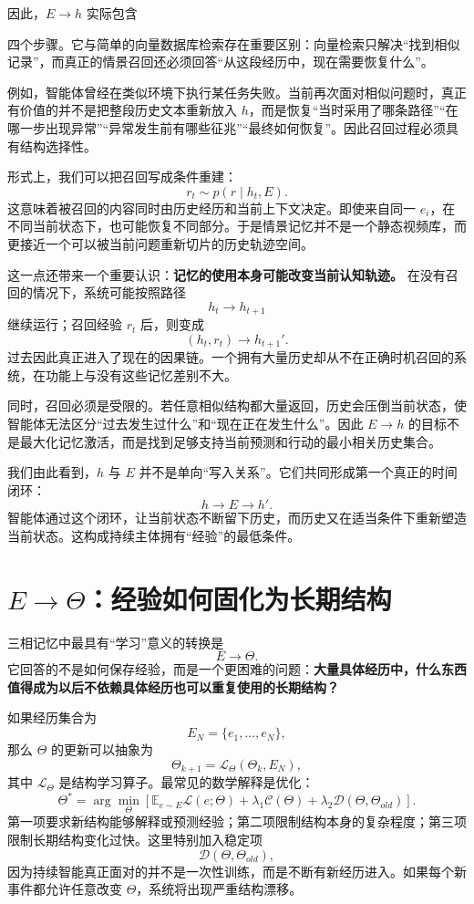 因此，$E\rightarrow h$ 实际包含
\begin{statementbox}
\centering
{}
\end{statementbox}
四个步骤。它与简单的向量数据库检索存在重要区别：向量检索只解决“找到相似记录”，而真正的情景召回还必须回答“从这段经历中，现在需要恢复什么”。

例如，智能体曾经在类似环境下执行某任务失败。当前再次面对相似问题时，真正有价值的并不是把整段历史文本重新放入 $h$，而是恢复“当时采用了哪条路径”“在哪一步出现异常”“异常发生前有哪些征兆”“最终如何恢复”。因此召回过程必须具有结构选择性。

形式上，我们可以把召回写成条件重建：
\[
r_t
\sim
p
\left(
r\mid h_t,E
\right).
\]
这意味着被召回的内容同时由历史经历和当前上下文决定。即使来自同一 $e_i$，在不同当前状态下，也可能恢复不同部分。于是情景记忆并不是一个静态视频库，而更接近一个可以被当前问题重新切片的历史轨迹空间。

这一点还带来一个重要认识：\textbf{记忆的使用本身可能改变当前认知轨迹。} 在没有召回的情况下，系统可能按照路径
\[
h_t
\rightarrow
h_{t+1}
\]
继续运行；召回经验 $r_t$ 后，则变成
\[
(h_t,r_t)
\rightarrow
h_{t+1}'.
\]
过去因此真正进入了现在的因果链。一个拥有大量历史却从不在正确时机召回的系统，在功能上与没有这些记忆差别不大。

同时，召回必须是受限的。若任意相似结构都大量返回，历史会压倒当前状态，使智能体无法区分“过去发生过什么”和“现在正在发生什么”。因此 $E\rightarrow h$ 的目标不是最大化记忆激活，而是找到足够支持当前预测和行动的最小相关历史集合。

我们由此看到，$h$ 与 $E$ 并不是单向“写入关系”。它们共同形成第一个真正的时间闭环：
\[
\boxed{
h
\rightarrow
E
\rightarrow
h'.
}
\]
智能体通过这个闭环，让当前状态不断留下历史，而历史又在适当条件下重新塑造当前状态。这构成持续主体拥有“经验”的最低条件。

\section{$E\rightarrow\Theta$：经验如何固化为长期结构}

三相记忆中最具有“学习”意义的转换是
\[
\boxed{
E\rightarrow\Theta.
}
\]
它回答的不是如何保存经验，而是一个更困难的问题：\textbf{大量具体经历中，什么东西值得成为以后不依赖具体经历也可以重复使用的长期结构？}

如果经历集合为
\[
E_N
=
\{e_1,\ldots,e_N\},
\]
那么 $\Theta$ 的更新可以抽象为
\[
\Theta_{k+1}
=
\mathcal L_{\Theta}
\left(
\Theta_k,
E_N
\right),
\]
其中 $\mathcal L_{\Theta}$ 是结构学习算子。最常见的数学解释是优化：
\[
\Theta^\ast
=
\arg\min_\Theta
\left[
\mathbb{E}_{e\sim E}
\mathcal L(e;\Theta)
+
\lambda_1
\mathcal C(\Theta)
+
\lambda_2
\mathcal D(\Theta,\Theta_{old})
\right].
\]
第一项要求新结构能够解释或预测经验；第二项限制结构本身的复杂程度；第三项限制长期结构变化过快。这里特别加入稳定项
\[
\mathcal D(\Theta,\Theta_{old}),
\]
因为持续智能真正面对的并不是一次性训练，而是不断有新经历进入。如果每个新事件都允许任意改变 $\Theta$，系统将出现严重结构漂移。

